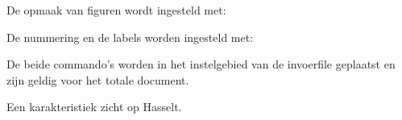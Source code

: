 De opmaak van figuren wordt ingesteld met:


De nummering en de labels worden ingesteld met:


De beide commando's worden in het instelgebied van de
invoerfile geplaatst en zijn geldig voor het totale
document.

\startbuffer
\stelplaatsblokkenin
  [plaats=rechts]

\stelblokkopjesin
  [plaats=boven,
   letter=vetschuin]

\plaatsfiguur
  {Een karakteristiek zicht op Hasselt.}
  {\externfiguur[ma-cb-12][breedte=8cm]}
\stopbuffer

\typebuffer

\start
\haalbuffer
\stop

\stoponderdeel
